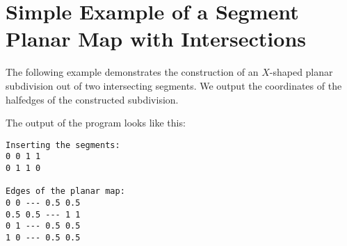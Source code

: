 
\section{Simple Example of a Segment Planar Map with Intersections}
\label{ssec:example1}
The following example demonstrates the construction of an
$X$-shaped planar subdivision out of two intersecting segments.
We output the coordinates of the halfedges of the constructed
subdivision.


The output of the program looks like this:
\begin{verbatim}
Inserting the segments:
0 0 1 1
0 1 1 0

Edges of the planar map:
0 0 --- 0.5 0.5
0.5 0.5 --- 1 1
0 1 --- 0.5 0.5
1 0 --- 0.5 0.5
\end{verbatim}








